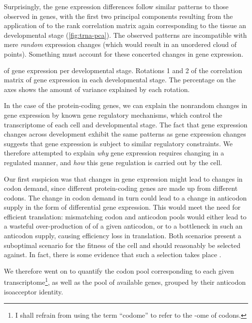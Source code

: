 Surprisingly, the \trna gene expression differences follow similar patterns to
those observed in \mrna genes, with the first two principal components resulting
from the application of \pca to the rank correlation matrix again corresponding
to the tissue an developmental stage (\cref{fig:trna-pca}). The observed
patterns are incompatible with mere \emph{random} expression changes (which
would result in an unordered cloud of points). Something must account for these
concerted changes in \trna gene expression.

    {\pca of \trna gene expression per developmental stage.}
    {Rotations \num{1} and \num{2} of the correlation matrix of
    \trna gene expression in each developmental stage. The percentage on the
    axes shows the amount of variance explained by each rotation.}

In the case of the protein-coding genes, we can explain the nonrandom changes in
gene expression by known gene regulatory mechanisms, which control the
transcriptome of each cell and developmental stage. The fact that \trna gene
expression changes across development exhibit the same patterns as \mrna gene
expression changes suggests that \trna gene expression is subject to similar
regulatory constraints. We therefore attempted to explain \emph{why} \trna gene
expression requires changing in a regulated manner, and \emph{how} this \trna
gene regulation is carried out by the cell.

Our first suspicion was that changes in \mrna gene expression might lead to
changes in codon demand, since different protein-coding genes are made up from
different codons. The change in codon demand in turn could lead to a change in
anticodon supply in the form of differential \trna gene expression. This would
meet the need for efficient translation: mismatching codon and anticodon pools
would either lead to a wasteful over-production of \trna[s] of a given
anticodon, or to a bottleneck in such an anticodon supply, causing efficiency
loss in translation. Both scenarios present a suboptimal scenario for the
fitness of the cell and should reasonably be selected against. In fact, there is
some evidence that such a selection takes place
\citep{Ikemura:1981,Ikemura:1985,Yang:2008}.

We therefore went on to quantify the codon pool corresponding to each given
transcriptome\footnote{I shall refrain from using the term “codome” to refer to
the -ome of codons.}, as well as the pool of available \trna genes, grouped by
their anticodon isoacceptor identity.

